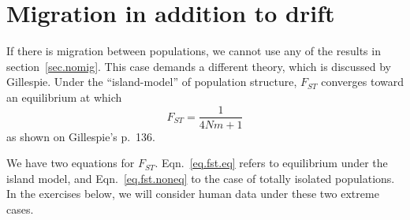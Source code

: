 \documentclass[twocolumn]{article}
\begin{document}
\section{Migration in addition to drift}

If there is migration between populations, we cannot use any of the
results in section~\ref{sec.nomig}.  This case demands a different
theory, which is discussed by Gillespie.  Under the ``island-model''
of population structure, $F_{ST}$ converges toward an equilibrium at
which
\begin{equation}
F_{ST} = \frac{1}{4Nm+1}
\label{eq.fst.eq}
\end{equation}
as shown on Gillespie's p.~136.

We have two equations for $F_{ST}$.  Eqn.~\ref{eq.fst.eq} refers to
equilibrium under the island model, and Eqn.~\ref{eq.fst.noneq} to the
case of totally isolated populations.  In the exercises below, we will
consider human data under these two extreme cases.
\end{document}
